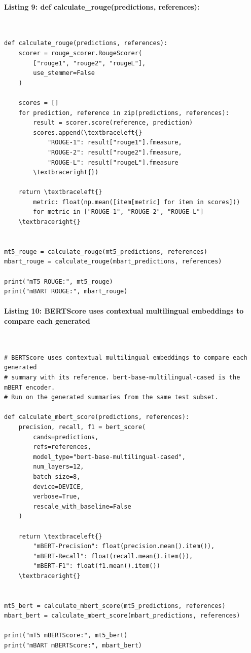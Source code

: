 \documentclass[12pt,a4paper,oneside]{report}
\begin{document}
\paragraph{Listing 9: def calculate\_rouge(predictions, references):}\mbox{}\\[-1ex]
\begin{Verbatim}[commandchars=\\\{\},breaklines=true,breakanywhere=true,fontsize=\scriptsize,frame=leftline,framesep=2mm,rulecolor=\color{gray}]
def calculate_rouge(predictions, references):
    scorer = rouge_scorer.RougeScorer(
        ["rouge1", "rouge2", "rougeL"],
        use_stemmer=False
    )

    scores = []
    for prediction, reference in zip(predictions, references):
        result = scorer.score(reference, prediction)
        scores.append(\textbraceleft{}
            "ROUGE-1": result["rouge1"].fmeasure,
            "ROUGE-2": result["rouge2"].fmeasure,
            "ROUGE-L": result["rougeL"].fmeasure
        \textbraceright{})

    return \textbraceleft{}
        metric: float(np.mean([item[metric] for item in scores]))
        for metric in ["ROUGE-1", "ROUGE-2", "ROUGE-L"]
    \textbraceright{}


mt5_rouge = calculate_rouge(mt5_predictions, references)
mbart_rouge = calculate_rouge(mbart_predictions, references)

print("mT5 ROUGE:", mt5_rouge)
print("mBART ROUGE:", mbart_rouge)
\end{Verbatim}
\paragraph{Listing 10: BERTScore uses contextual multilingual embeddings to compare each generated}\mbox{}\\[-1ex]
\begin{Verbatim}[commandchars=\\\{\},breaklines=true,breakanywhere=true,fontsize=\scriptsize,frame=leftline,framesep=2mm,rulecolor=\color{gray}]
# BERTScore uses contextual multilingual embeddings to compare each generated
# summary with its reference. bert-base-multilingual-cased is the mBERT encoder.
# Run on the generated summaries from the same test subset.

def calculate_mbert_score(predictions, references):
    precision, recall, f1 = bert_score(
        cands=predictions,
        refs=references,
        model_type="bert-base-multilingual-cased",
        num_layers=12,
        batch_size=8,
        device=DEVICE,
        verbose=True,
        rescale_with_baseline=False
    )

    return \textbraceleft{}
        "mBERT-Precision": float(precision.mean().item()),
        "mBERT-Recall": float(recall.mean().item()),
        "mBERT-F1": float(f1.mean().item())
    \textbraceright{}


mt5_bert = calculate_mbert_score(mt5_predictions, references)
mbart_bert = calculate_mbert_score(mbart_predictions, references)

print("mT5 mBERTScore:", mt5_bert)
print("mBART mBERTScore:", mbart_bert)
\end{Verbatim}
\end{document}
